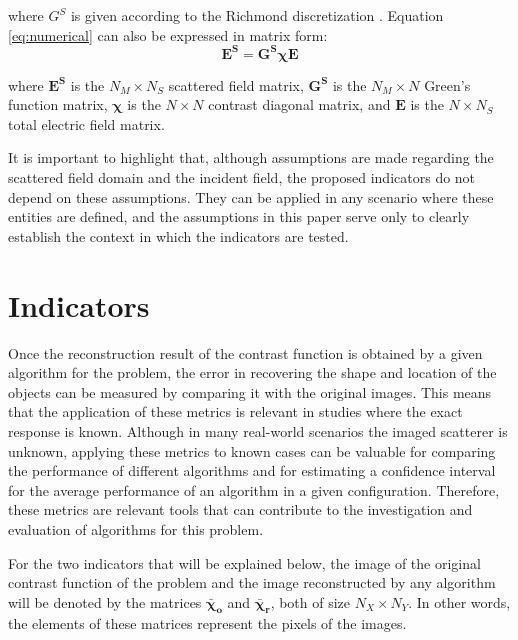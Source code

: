 \documentclass{IEEEtran}
\newcommand{\Es}{\mathbf{E^S}}
\newcommand{\GS}{\mathbf{G^S}}
\newcommand{\X}{\boldsymbol{\chi}}
\newcommand{\E}{\mathbf{E}}
\newcommand{\Xo}{\boldsymbol{\bar{\chi}_o}}
\newcommand{\Xr}{\boldsymbol{\bar{\chi}_r}}
\begin{document}
		\noindent where $G^S$ is given according to the Richmond discretization \cite{richmond1965scattering, pastorino2010ch3}. Equation \eqref{eq:numerical} can also be expressed in matrix form:
		\begin{equation}
			\Es = \GS\X\E
		\end{equation}
		
		\noindent where $\Es$ is the $N_M \times N_S$ scattered field matrix, $\GS$ is the $N_M \times N$ Green's function matrix, $\X$ is the $N \times N$ contrast diagonal matrix, and $\E$ is the $N \times N_S$ total electric field matrix.
		
		It is important to highlight that, although assumptions are made regarding the scattered field domain and the incident field, the proposed indicators do not depend on these assumptions. They can be applied in any scenario where these entities are defined, and the assumptions in this paper serve only to clearly establish the context in which the indicators are tested.
	
	\section{Indicators}\label{sec:indicators}

		
		Once the reconstruction result of the contrast function is obtained by a given algorithm for the problem, the error in recovering the shape and location of the objects can be measured by comparing it with the original images. This means that the application of these metrics is relevant in studies where the exact response is known. Although in many real-world scenarios the imaged scatterer is unknown, applying these metrics to known cases can be valuable for comparing the performance of different algorithms and for estimating a confidence interval for the average performance of an algorithm in a given configuration. Therefore, these metrics are relevant tools that can contribute to the investigation and evaluation of algorithms for this problem.
		
		For the two indicators that will be explained below, the image of the original contrast function of the problem and the image reconstructed by any algorithm will be denoted by the matrices $\Xo$ and $\Xr$, both of size $N_X \times N_Y$. In other words, the elements of these matrices represent the pixels of the images.

	
\end{document}
